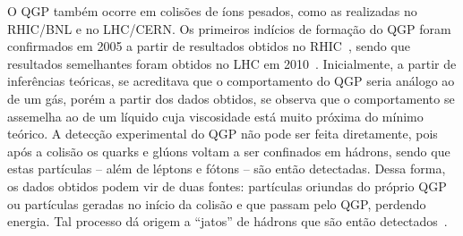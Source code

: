 O QGP também ocorre em colisões de íons pesados, como as realizadas no RHIC/BNL e no LHC/CERN. Os primeiros indícios de formação do QGP foram confirmados em 2005 a partir de resultados obtidos no RHIC~\cite{QGP1}, sendo que resultados semelhantes foram obtidos no LHC em 2010~\cite{QGP2}. Inicialmente, a partir de inferências teóricas, se acreditava que o comportamento do QGP seria análogo ao de um gás, porém a partir dos dados obtidos, se observa que o comportamento se assemelha ao de um líquido cuja viscosidade está muito próxima do mínimo teórico\cite{QGP1}. A detecção experimental do QGP não pode ser feita diretamente, pois após a colisão os quarks e glúons voltam a ser confinados em hádrons, sendo que estas partículas -- além de léptons e fótons -- são então detectadas. Dessa forma, os dados obtidos podem vir de duas fontes: partículas oriundas do próprio QGP ou partículas geradas no início da colisão e que passam pelo QGP, perdendo energia. Tal processo dá origem a ``jatos'' de hádrons que são então detectados~\cite{QGP3, QGP4}.



